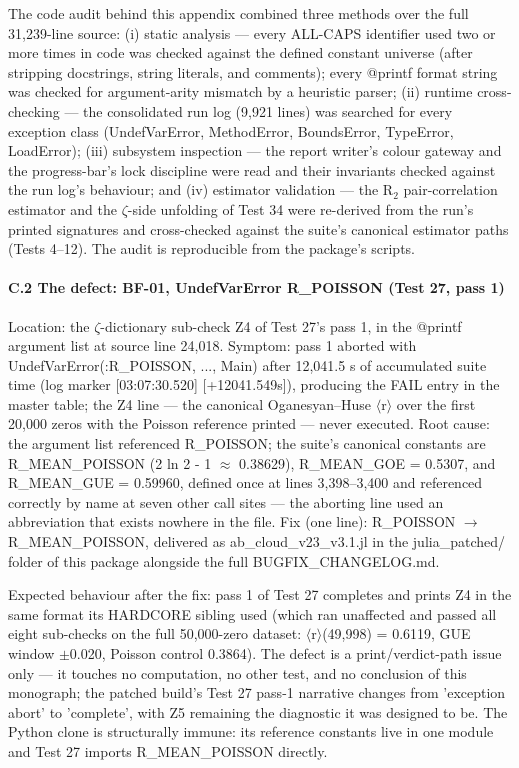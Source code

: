 \documentclass[10pt]{article}
\begin{document}
The code audit behind this appendix combined three methods over the full 31,239-line source: (i) static analysis --- every ALL-CAPS identifier used two or more times in code was checked against the defined constant universe (after stripping docstrings, string literals, and comments); every @printf format string was checked for argument-arity mismatch by a heuristic parser; (ii) runtime cross-checking --- the consolidated run log (9,921 lines) was searched for every exception class (UndefVarError, MethodError, BoundsError, TypeError, LoadError); (iii) subsystem inspection --- the report writer's colour gateway and the progress-bar's lock discipline were read and their invariants checked against the run log's behaviour; and (iv) estimator validation --- the R$_2$ pair-correlation estimator and the $\zeta$-side unfolding of Test 34 were re-derived from the run's printed signatures and cross-checked against the suite's canonical estimator paths (Tests 4--12). The audit is reproducible from the package's scripts.

\paragraph{C.2 The defect: BF-01, UndefVarError R\_POISSON (Test 27, pass 1)}

Location: the $\zeta$-dictionary sub-check Z4 of Test 27's pass 1, in the @printf argument list at source line 24,018. Symptom: pass 1 aborted with UndefVarError(:R\_POISSON, ..., Main) after 12,041.5 s of accumulated suite time (log marker [03:07:30.520] [+12041.549s]), producing the FAIL entry in the master table; the Z4 line --- the canonical Oganesyan--Huse $\langle$r$\rangle$ over the first 20,000 zeros with the Poisson reference printed --- never executed. Root cause: the argument list referenced R\_POISSON; the suite's canonical constants are R\_MEAN\_POISSON (2 ln 2 - 1 $\approx$ 0.38629), R\_MEAN\_GOE = 0.5307, and R\_MEAN\_GUE = 0.59960, defined once at lines 3,398--3,400 and referenced correctly by name at seven other call sites --- the aborting line used an abbreviation that exists nowhere in the file. Fix (one line): R\_POISSON $\rightarrow$ R\_MEAN\_POISSON, delivered as ab\_cloud\_v23\_v3.1.jl in the julia\_patched/ folder of this package alongside the full BUGFIX\_CHANGELOG.md.

Expected behaviour after the fix: pass 1 of Test 27 completes and prints Z4 in the same format its HARDCORE sibling used (which ran unaffected and passed all eight sub-checks on the full 50,000-zero dataset: $\langle$r$\rangle$(49,998) = 0.6119, GUE window $\pm$0.020, Poisson control 0.3864). The defect is a print/verdict-path issue only --- it touches no computation, no other test, and no conclusion of this monograph; the patched build's Test 27 pass-1 narrative changes from 'exception abort' to 'complete', with Z5 remaining the diagnostic it was designed to be. The Python clone is structurally immune: its reference constants live in one module and Test 27 imports R\_MEAN\_POISSON directly.
\end{document}
